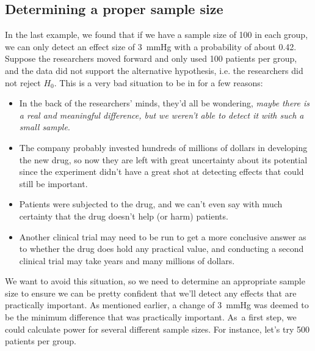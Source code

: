 \subsection{Determining a proper sample size}

In the last example, we found that if we have a sample size of 100 in each group, we can only detect an effect size of 3~mmHg with a probability of about 0.42. Suppose the researchers moved forward and only used 100 patients per group, and the data did not support the alternative hypothesis, i.e. the researchers did not reject $H_0$. This is a very bad situation to be in for a few reasons:
\begin{itemize}
\setlength{\itemsep}{0mm}
\item In the back of the researchers' minds, they'd all be wondering, \emph{maybe there is a real and meaningful difference, but we weren't able to detect it with such a small sample}. 
\item The company probably invested hundreds of millions of dollars in developing the new drug, so now they are left with great uncertainty about its potential since the experiment didn't have a great shot at detecting effects that could still be important.
\item Patients were subjected to the drug, and we can't even say with much certainty that the drug doesn't help (or harm) patients.
\item Another clinical trial may need to be run to get a more conclusive answer as to whether the drug does hold any practical value, and conducting a second clinical trial may take years and many millions of dollars.
\end{itemize}
We want to avoid this situation, so we need to determine an appropriate sample size to ensure we can be pretty confident that we'll detect any effects that are practically important. As mentioned earlier, a change of 3~mmHg was deemed to be the minimum difference that was practically important. As~a first step, we could calculate power for several different sample sizes. For instance, let's try 500 patients per group.

